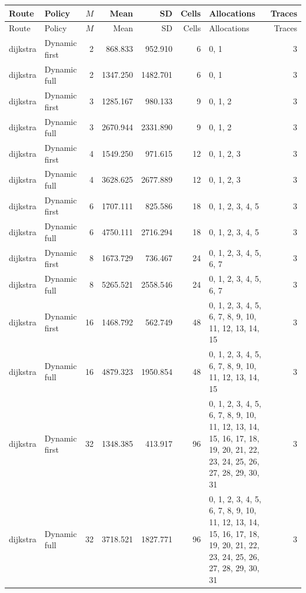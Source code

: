 \documentclass[10pt,a4paper]{article}
\begin{document}
\tiny\setlength{\tabcolsep}{2pt}\begin{longtable}{@{}p{23mm}p{29mm}rrrrp{36mm}r@{}}
\toprule Route & Policy & $M$ & Mean & SD & Cells & Allocations & Traces \\ \midrule\endfirsthead
\toprule Route & Policy & $M$ & Mean & SD & Cells & Allocations & Traces \\ \midrule\endhead
\bottomrule\endfoot
dijkstra & Dynamic first & 2 & 868.833 & 952.910 & 6 & 0, 1 & 3 \\
dijkstra & Dynamic full & 2 & 1347.250 & 1482.701 & 6 & 0, 1 & 3 \\
dijkstra & Dynamic first & 3 & 1285.167 & 980.133 & 9 & 0, 1, 2 & 3 \\
dijkstra & Dynamic full & 3 & 2670.944 & 2331.890 & 9 & 0, 1, 2 & 3 \\
dijkstra & Dynamic first & 4 & 1549.250 & 971.615 & 12 & 0, 1, 2, 3 & 3 \\
dijkstra & Dynamic full & 4 & 3628.625 & 2677.889 & 12 & 0, 1, 2, 3 & 3 \\
dijkstra & Dynamic first & 6 & 1707.111 & 825.586 & 18 & 0, 1, 2, 3, 4, 5 & 3 \\
dijkstra & Dynamic full & 6 & 4750.111 & 2716.294 & 18 & 0, 1, 2, 3, 4, 5 & 3 \\
dijkstra & Dynamic first & 8 & 1673.729 & 736.467 & 24 & 0, 1, 2, 3, 4, 5, 6, 7 & 3 \\
dijkstra & Dynamic full & 8 & 5265.521 & 2558.546 & 24 & 0, 1, 2, 3, 4, 5, 6, 7 & 3 \\
dijkstra & Dynamic first & 16 & 1468.792 & 562.749 & 48 & 0, 1, 2, 3, 4, 5, 6, 7, 8, 9, 10, 11, 12, 13, 14, 15 & 3 \\
dijkstra & Dynamic full & 16 & 4879.323 & 1950.854 & 48 & 0, 1, 2, 3, 4, 5, 6, 7, 8, 9, 10, 11, 12, 13, 14, 15 & 3 \\
dijkstra & Dynamic first & 32 & 1348.385 & 413.917 & 96 & 0, 1, 2, 3, 4, 5, 6, 7, 8, 9, 10, 11, 12, 13, 14, 15, 16, 17, 18, 19, 20, 21, 22, 23, 24, 25, 26, 27, 28, 29, 30, 31 & 3 \\
dijkstra & Dynamic full & 32 & 3718.521 & 1827.771 & 96 & 0, 1, 2, 3, 4, 5, 6, 7, 8, 9, 10, 11, 12, 13, 14, 15, 16, 17, 18, 19, 20, 21, 22, 23, 24, 25, 26, 27, 28, 29, 30, 31 & 3 \\
\end{longtable}\normalsize\setlength{\tabcolsep}{6pt}
\clearpage
\end{document}
